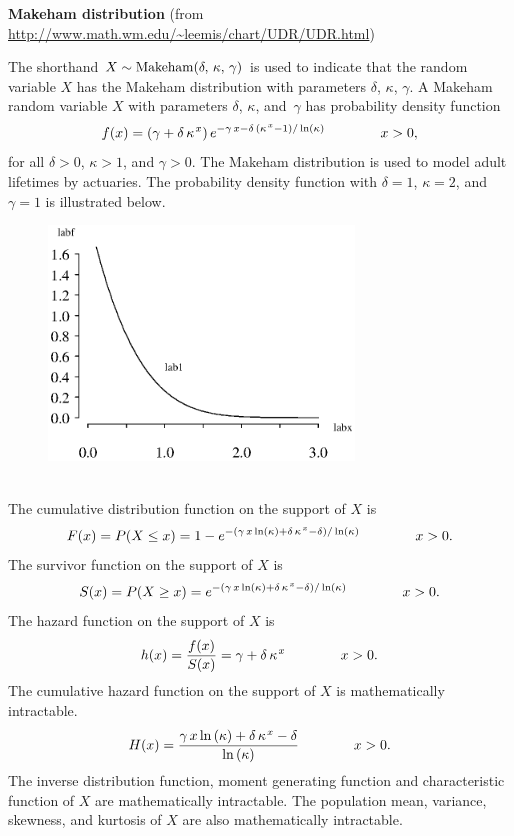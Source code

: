\documentclass[12pt,fullpage]{article}
\begin{document}
\noindent
{\bf Makeham distribution} (from \color{blue}\url{http://www.math.wm.edu/~leemis/chart/UDR/UDR.html}\color{black})

\noindent
The shorthand $X \sim {\rm Makeham}(\delta,\, \kappa,\, \gamma)$ is used to indicate that the
random variable $X$ has the Makeham distribution with parameters $\delta$, $\kappa$, $\gamma$.
A Makeham random variable $X$ with parameters $\delta$, $\kappa$, and~$\gamma$ has probability density function 
$$
f(x) = \left( \gamma+{\it \delta}\,{{\it \kappa}}^{\kern 0.08 em x} \right) {e^{-\gamma\,x-
{{\it \delta}\, \left( {{\it \kappa}}^{\kern 0.08 em x}-1 \right)/ \ln 
 \left( {\it \kappa} \right) }}} \qquad \qquad x > 0,
$$
for all $\delta> 0$, $\kappa >1$, and $\gamma>0$. 
The Makeham distribution is used to model adult lifetimes by actuaries.
The probability density function with $\delta=1$, $\kappa=2$, and $\gamma=1$ is illustrated below.
{\begin{figure}[h!]
\begin{center}
\includegraphics[width=3.2in]{MakehamPlot.ps}
\end{center}
\end{figure}}\\
The cumulative distribution function on
the support of $X$ is
$$
F(x) = P(X \le x) = 1 -{e^{-{(\gamma\,x\ln  \left( {\it \kappa} \right) +{\it 
\delta}\,{{\it \kappa}}^{\kern 0.08 em x}-{\it \delta}) / \ln  \left( {\it \kappa}
 \right) }}}  \qquad \qquad x > 0.
$$
The survivor function on the support of $X$ is
$$
S(x) = P(X \ge x) = {e^{-{(\gamma\,x\ln  \left( {\it \kappa} \right) +{\it 
\delta}\,{{\it \kappa}}^{\kern 0.08 em x}-{\it \delta})/\ln  \left( {\it \kappa}
 \right) }}}  \qquad \qquad x > 0.
$$
The hazard function on the support of $X$ is
$$
h(x) = \frac{f(x)}{S(x)} = \gamma+{\it \delta}\,{{\it \kappa}}^{\kern 0.08 em x} \qquad \qquad x > 0.
$$
The cumulative hazard function on the support of $X$ is mathematically intractable.
$$
H(x) = {\frac {\gamma\,x\ln  \left( {\it \kappa} \right) +{\it \delta}\,{
{\it \kappa}}^{\kern 0.08 em x}-{\it \delta}}{\ln  \left( {\it \kappa} \right) }} \qquad \qquad x > 0.
$$
The inverse distribution function, moment generating function and characteristic function of $X$ are mathematically intractable. The population mean, variance, skewness, and kurtosis of $X$ are also mathematically intractable.
\end{document}
